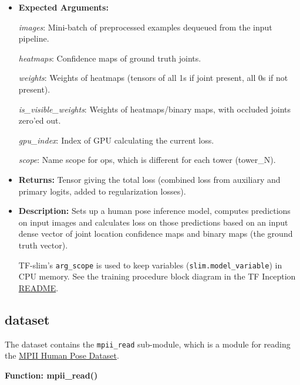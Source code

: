 \documentclass{scrreprt}
\begin{document}
\begin{itemize}
        \item \textbf{Expected Arguments:}

        \textit{images}: Mini-batch of preprocessed examples dequeued from the
                input pipeline.

        \textit{heatmaps}: Confidence maps of ground truth joints.

        \textit{weights}: Weights of heatmaps (tensors of all 1s if joint
                present, all 0s if not present).

        \textit{is\_visible\_weights}: Weights of heatmaps/binary maps, with
                occluded joints zero'ed out.

        \textit{gpu\_index}: Index of GPU calculating the current loss.

        \textit{scope}: Name scope for ops, which is different for each tower
                (tower\_N).

        \item \textbf{Returns:} Tensor giving the total loss (combined loss
                from auxiliary and primary logits, added to regularization
                losses).

        \item \textbf{Description:} Sets up a human pose inference model,
                computes predictions on input images and calculates loss on
                those predictions based on an input dense vector of joint
                location confidence maps and binary maps (the ground truth
                vector).

                TF-slim's \verb|arg_scope| is used to keep variables
                (\verb|slim.model_variable|) in CPU memory. See the training
                procedure block diagram in the TF Inception
                \href{https://github.com/tensorflow/models/tree/master/inception}{README}.
\end{itemize}

\subsection{dataset}

The dataset contains the \verb|mpii_read| sub-module, which is a module for
reading the \href{http://human-pose.mpi-inf.mpg.de/}{MPII Human Pose Dataset}.

\textbf{Function: mpii\_read()}
\end{document}
